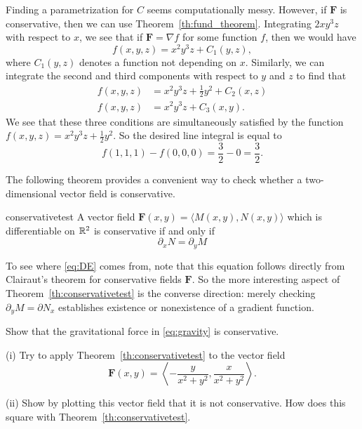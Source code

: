 \documentclass[svgnames]{report}
\begin{document}
\begin{solution}
  Finding a parametrization for $C$ seems computationally messy.
  However, if $\mathbf{F}$ is conservative, then we can use
  Theorem~\ref{th:fund_theorem}. Integrating $2  x y^{3} z$ with
  respect to $x$, we see that if $\mathbf{F} = \nabla f$ for some
  function $f$, then we would have 
  \[
    f(x,y,z) = x^2 y^3 z + C_1(y,z), 
  \]
  where $C_1(y,z)$ denotes a function not depending on $x$. Similarly,
  we can integrate the second and third components with respect to $y$
  and $z$ to find that
  \begin{align*}
    f(x,y,z) &= x^2 y^3 z + \frac{1}{2}y^2 + C_2(x,z) \\
    f(x,y,z) &= x^2 y^3 z + C_3(x,y). 
  \end{align*}
  We see that these three conditions are simultaneously satisfied by
  the function $f(x,y,z) = x^2 y^3 z + \tfrac{1}{2}y^2$. So the
  desired line integral is equal to 
  \[
    f(1,1,1) - f(0,0,0) = \frac{3}{2} - 0  = \boxed{\frac{3}{2}}. 
  \]
\end{solution}

The following theorem provides a convenient way to check whether a
two-dimensional vector field is conservative. 

\begin{theo}{}{conservativetest}
  A vector field $\mathbf{F}(x,y) = \langle M(x,y), N(x,y)\rangle$
  which is differentiable on $\mathbb{R}^2$ is
  conservative if and only if
  \begin{equation} \label{eq:DE}
    \partial_x N = \partial_y M
  \end{equation}
\end{theo}
To see where \eqref{eq:DE} comes from, note that this equation follows directly
from Clairaut's theorem for conservative fields $\mathbf{F}$. 
So the more interesting aspect of Theorem~\ref{th:conservativetest} is
the converse direction: merely checking $\partial_y M = \partial N_x$
establishes existence or nonexistence of a gradient function. 

\begin{exercise}{}{}
  Show that the gravitational force in \eqref{eq:gravity} is
  conservative.
\end{exercise}

\begin{exercise}{}{}
  (i) Try to apply Theorem~\ref{th:conservativetest}  to the vector
  field
  \[
    \mathbf{F}(x,y) = \left\langle
      -\frac{y}{{x^2+y^2}},
      \frac{x}{{x^2+y^2}}
    \right\rangle. 
  \]
  
  (ii) Show by plotting this vector field that it is not
  conservative. How does this square with Theorem~\ref{th:conservativetest}. 
\end{exercise}
\end{document}

